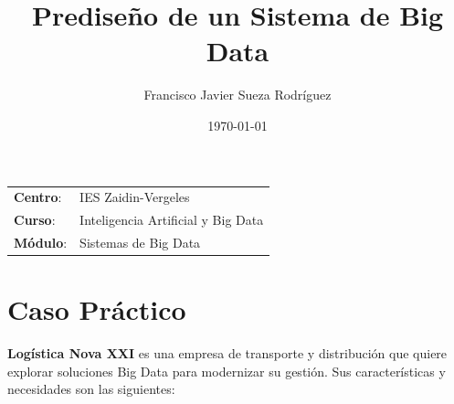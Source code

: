 


\title{
\vspace{10ex}
\normalfont \normalsize
\huge \textbf{Prediseño de un Sistema de Big Data}
}
\author{Francisco Javier Sueza Rodríguez}
\date{\normalsize\today}

\glsenablehyper
\makeglossaries
{}




\maketitle

\thispagestyle{empty}

\vspace{75ex}

\begin{center}
    \begin{tabular}{l l}
        \textbf{Centro}: & IES Zaidin-Vergeles \\
        \textbf{Curso}: & Inteligencia Artificial y Big Data\\
        \textbf{Módulo}: & Sistemas de Big Data \\
    \end{tabular}
\end{center}

\newpage

\begingroup
\hypersetup{linkcolor=black}
\tableofcontents
\endgroup

\newpage

\begingroup
\hypersetup{linkcolor=black}
\listoffigures             
\endgroup

\newpage

\section{Caso Práctico}
\textbf{Logística Nova XXI} es una empresa de transporte y distribución que quiere explorar soluciones Big Data para modernizar su gestión. Sus características y necesidades son las siguientes:

